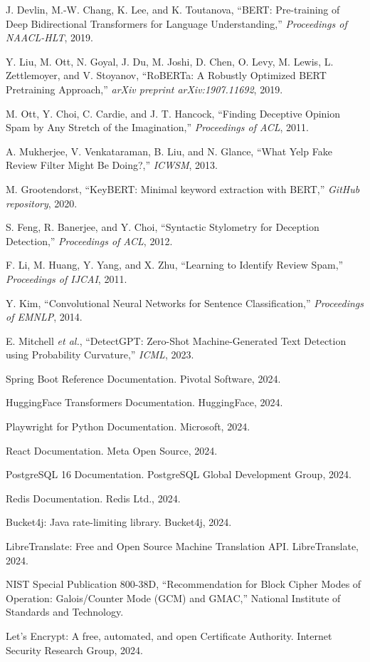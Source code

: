 \documentclass[12pt,a4paper,oneside]{report}
\begin{document}
\begin{enumerate}[leftmargin=*,label={[\arabic*]}]
  \item J. Devlin, M.-W. Chang, K. Lee, and K. Toutanova, ``BERT:
        Pre-training of Deep Bidirectional Transformers for Language
        Understanding,'' \textit{Proceedings of NAACL-HLT}, 2019.
  \item Y. Liu, M. Ott, N. Goyal, J. Du, M. Joshi, D. Chen, O. Levy,
        M. Lewis, L. Zettlemoyer, and V. Stoyanov, ``RoBERTa: A Robustly
        Optimized BERT Pretraining Approach,'' \textit{arXiv preprint
        arXiv:1907.11692}, 2019.
  \item M. Ott, Y. Choi, C. Cardie, and J. T. Hancock, ``Finding
        Deceptive Opinion Spam by Any Stretch of the Imagination,''
        \textit{Proceedings of ACL}, 2011.
  \item A. Mukherjee, V. Venkataraman, B. Liu, and N. Glance, ``What
        Yelp Fake Review Filter Might Be Doing?,'' \textit{ICWSM},
        2013.
  \item M. Grootendorst, ``KeyBERT: Minimal keyword extraction with
        BERT,'' \textit{GitHub repository}, 2020.
  \item S. Feng, R. Banerjee, and Y. Choi, ``Syntactic Stylometry for
        Deception Detection,'' \textit{Proceedings of ACL}, 2012.
  \item F. Li, M. Huang, Y. Yang, and X. Zhu, ``Learning to Identify
        Review Spam,'' \textit{Proceedings of IJCAI}, 2011.
  \item Y. Kim, ``Convolutional Neural Networks for Sentence
        Classification,'' \textit{Proceedings of EMNLP}, 2014.
  \item E. Mitchell \textit{et al.}, ``DetectGPT: Zero-Shot
        Machine-Generated Text Detection using Probability Curvature,''
        \textit{ICML}, 2023.
  \item Spring Boot Reference Documentation. Pivotal Software, 2024.
  \item HuggingFace Transformers Documentation. HuggingFace, 2024.
  \item Playwright for Python Documentation. Microsoft, 2024.
  \item React Documentation. Meta Open Source, 2024.
  \item PostgreSQL 16 Documentation. PostgreSQL Global Development
        Group, 2024.
  \item Redis Documentation. Redis Ltd., 2024.
  \item Bucket4j: Java rate-limiting library. Bucket4j, 2024.
  \item LibreTranslate: Free and Open Source Machine Translation API.
        LibreTranslate, 2024.
  \item NIST Special Publication 800-38D, ``Recommendation for Block
        Cipher Modes of Operation: Galois/Counter Mode (GCM) and
        GMAC,'' National Institute of Standards and Technology.
  \item Let's Encrypt: A free, automated, and open Certificate
        Authority. Internet Security Research Group, 2024.
\end{enumerate}
\end{document}

